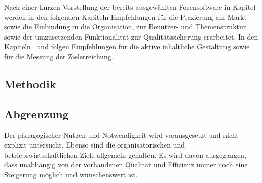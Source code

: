 Nach einer kurzen Vorstellung der bereits ausgewählten Forensoftware in Kapitel~ werden in den folgenden Kapiteln Empfehlungen für die Plazierung am Markt  sowie die Einbindung in die Organisation, zur Benutzer- und Themenstruktur sowie der umzusetzenden Funktionalität zur Qualitätssicherung erarbeitet. In den Kapiteln~ und  folgen Empfehlungen für die aktive inhaltliche Gestaltung sowie für die Messung der Zielerreichung.

\subsection{Methodik} %
\label{sub:methodik}


\subsection{Abgrenzung} %
\label{sub:abgrenzung}
Der pädagogischer Nutzen und Notwendigkeit wird vorausgesetzt und nicht explizit untersucht. Ebenso sind die organisatorischen und betriebswirtschaftlichen Ziele allgemein gehalten. Es wird davon ausgegangen, dass unabhängig von der vorhandenen Qualität und Effizienz immer noch eine Steigerung möglich und wünschenswert ist.


